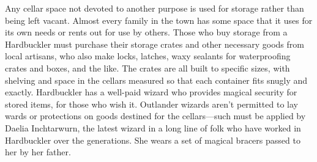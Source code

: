 \documentclass[10pt,a4paper,twoside,twocolumn,openany,bg=print,nodeprecatedcode]{dndbook}
\begin{document}
Any cellar space not devoted to another purpose is used for storage rather than being left vacant. Almost every family in the town has some space that it uses for its own needs or rents out for use by others. Those who buy storage from a Hardbuckler must purchase their storage crates and other necessary goods from local artisans, who also make locks, latches, waxy sealants for waterproofing crates and boxes, and the like. The crates are all built to specific sizes, with shelving and space in the cellars measured so that each container fits snugly and exactly.
Hardbuckler has a well-paid wizard who provides magical security for stored items, for those who wish it. Outlander wizards aren't permitted to lay wards or protections on goods destined for the cellars—such must be applied by Daelia Inchtarwurn, the latest wizard in a long line of folk who have worked in Hardbuckler over the generations. She wears a set of magical bracers passed to her by her father.
\end{document}
